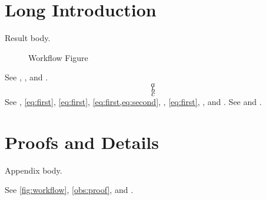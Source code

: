 \section[Short Intro]{Long Introduction}\label{sec:intro}
\begin{oblemma}\label{obs:main}
Result body.
\end{oblemma}
\begin{figure}\caption[Workflow Short]{Workflow Figure}\label{fig:workflow}\end{figure}
See , , and .
\begin{equation}\label{eq:first}a\end{equation}
\begin{equation}\label{eq:second}b\end{equation}
\begin{equation}\label{eq:third}c\end{equation}
See , \eqref{eq:first}, \autoref{eq:first}, \cref{eq:first,eq:second}, , \vref{eq:first}, , and .
See  and .
\appendices
\section[Proof Notes]{Proofs and Details}\label{sec:proof}
\begin{oblemma}\label{obs:proof}
Appendix body.
\end{oblemma}
See \autoref{fig:workflow}, \cref{obs:proof}, and .
